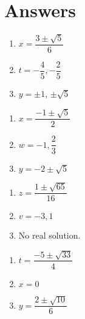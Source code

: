 \documentclass[11pt]{article}
\theoremstyle{definition}  %
\newcounter{HW}
\begin{document}
\newpage

\section{Answers}

\begin{multicols}{3}
\begin{enumerate}

\item  $x = \dfrac{3 \pm \sqrt{5}}{6}$ 
\item  $t = -\dfrac{4}{5}, -\dfrac{2}{5}$ 
\item  $y = \pm 1$, $\pm \sqrt{5}$ 

\setcounter{HW}{\value{enumi}}
\end{enumerate}
\end{multicols}

\begin{multicols}{3}
\begin{enumerate}
\setcounter{enumi}{\value{HW}}

\item $x = \dfrac{-1 \pm \sqrt{5}}{2}$
\item $w = -1, \dfrac{2}{3}$ 
\item $y = -2 \pm \sqrt{5}$

\setcounter{HW}{\value{enumi}}
\end{enumerate}
\end{multicols}

\begin{multicols}{3}
\begin{enumerate}
\setcounter{enumi}{\value{HW}}

\item $z = \dfrac{1 \pm \sqrt{65}}{16}$
\item  $v = -3, 1$
\item No real solution.

\setcounter{HW}{\value{enumi}}
\end{enumerate}
\end{multicols}

\begin{multicols}{3}
\begin{enumerate}
\setcounter{enumi}{\value{HW}}

\item $t = \dfrac{-5 \pm \sqrt{33}}{4}$
\item $x = 0$ 
\item $y = \dfrac{2 \pm \sqrt{10}}{6}$

\setcounter{HW}{\value{enumi}}
\end{enumerate}
\end{multicols}
\end{document}
